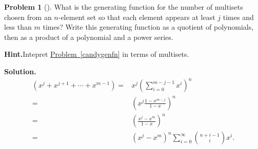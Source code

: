 \documentclass[10pt,]{book}
\theoremstyle{plain}
\theoremstyle{definition}
\newtheorem{activity}[project]{Problem}
\theoremstyle{definition}
\numberwithin{equation}{chapter}
\newcommand{\amp}{&}
\begin{document}
\begin{activity}[]\label{activity-198}
What is the generating function for the number of multisets chosen from an \(n\)-element set so that each element appears at least \(j\) times and less than \(m\) times? Write this generating function as a quotient of polynomials, then as a product of a polynomial and a power series.%
\par\medskip\noindent%
\textbf{Hint.}\quad Intepret \hyperref[candygenfn]{Problem~\ref{candygenfn}} in terms of multisets.%
\par\medskip\noindent%
\textbf{Solution.}\quad %
\begin{align*}
(x^j+x^{j+1}+\cdots+x^{m-1}) =\amp x^j
\left(\sum_{i=0}^{m-j-1}x^i\right)^n\\
=\amp
\left(x^j\frac{1-x^{m-j}}{1-x}\right)^n\\
=\amp \left(\frac{x^j-x^m}{1-x}\right)^n\\
=\amp  (x^j-x^m)^n\sum_{i=0}^\infty \binom{n+i-1}{i}x^i.
\end{align*}
%
\end{activity}
\end{document}
